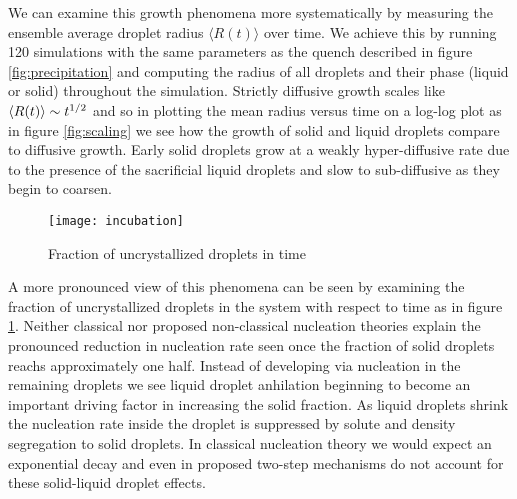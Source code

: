 We can examine this growth phenomena more systematically by measuring the
ensemble average droplet radius $\langle R(t) \rangle$ over time. We achieve
this by running 120 simulations with the same parameters as the quench
described in figure \ref{fig:precipitation} and computing the radius of all
droplets and their phase (liquid or solid) throughout the simulation. Strictly
diffusive growth scales like $\left\langle R(t) \right\rangle \sim t^{1/2}$ and so in plotting the
mean radius versus time on a log-log plot as in figure \ref{fig:scaling} we see
how the growth of solid and liquid droplets compare to diffusive growth. Early
solid droplets grow at a weakly hyper-diffusive rate due to the presence of
the sacrificial liquid droplets and slow to sub-diffusive as they begin to
coarsen.

\begin{figure}
    \centering
    \texttt{[image: incubation]}
    \caption[Fraction of uncrystallized droplets in time]{
        \label{fig:incubation}
        Fraction of uncrystallized droplets in time
    }
\end{figure}

A more pronounced view of this phenomena can be seen by examining the fraction
of uncrystallized droplets in the system with respect to time as in figure
\ref{fig:incubation}. Neither classical nor proposed non-classical nucleation
theories explain the pronounced reduction in nucleation rate seen once the
fraction of solid droplets reachs approximately one half. Instead of developing
via nucleation in the remaining droplets we see liquid droplet anhilation
beginning to become an important driving factor in increasing the solid
fraction. As liquid droplets shrink the nucleation rate inside the droplet is
suppressed by solute and density segregation to solid droplets. In classical
nucleation theory we would expect an exponential decay and even in proposed
two-step mechanisms do not account for these solid-liquid droplet
effects\cite{MYERSON04, MYERSON09}.


